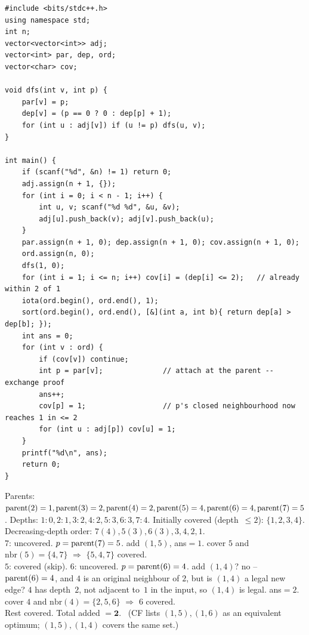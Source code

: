 \begin{lstlisting}[caption={Codeforces 1029E -- deepest-uncovered leaf-pruning greedy (\coderef{c27-greedy}), parent-attachment}, label={lst:c27-1029e-soln}]
#include <bits/stdc++.h>
using namespace std;
int n;
vector<vector<int>> adj;
vector<int> par, dep, ord;
vector<char> cov;

void dfs(int v, int p) {
    par[v] = p;
    dep[v] = (p == 0 ? 0 : dep[p] + 1);
    for (int u : adj[v]) if (u != p) dfs(u, v);
}

int main() {
    if (scanf("%d", &n) != 1) return 0;
    adj.assign(n + 1, {});
    for (int i = 0; i < n - 1; i++) {
        int u, v; scanf("%d %d", &u, &v);
        adj[u].push_back(v); adj[v].push_back(u);
    }
    par.assign(n + 1, 0); dep.assign(n + 1, 0); cov.assign(n + 1, 0);
    ord.assign(n, 0);
    dfs(1, 0);
    for (int i = 1; i <= n; i++) cov[i] = (dep[i] <= 2);   // already within 2 of 1
    iota(ord.begin(), ord.end(), 1);
    sort(ord.begin(), ord.end(), [&](int a, int b){ return dep[a] > dep[b]; });
    int ans = 0;
    for (int v : ord) {
        if (cov[v]) continue;
        int p = par[v];              // attach at the parent -- exchange proof
        ans++;
        cov[p] = 1;                  // p's closed neighbourhood now reaches 1 in <= 2
        for (int u : adj[p]) cov[u] = 1;
    }
    printf("%d\n", ans);
    return 0;
}
\end{lstlisting}

\begin{tracebox}[Official Example~1: $n=7$, edges $1\text{--}2,2\text{--}3,2\text{--}4,4\text{--}5,4\text{--}6,5\text{--}7$ $\Rightarrow$ 2]
Parents: $\operatorname{parent}(2)=1,\operatorname{parent}(3)=2,\operatorname{parent}(4)=2,\operatorname{parent}(5)=4,\operatorname{parent}(6)=4,\operatorname{parent}(7)=5$.
Depths: $1\!:\!0,2\!:\!1,3\!:\!2,4\!:\!2,5\!:\!3,6\!:\!3,7\!:\!4$. Initially covered
(depth~$\le2$): $\{1,2,3,4\}$. Decreasing-depth order: $7(4),5(3),6(3),3,4,2,1$.\\
$7$: uncovered. $p=\operatorname{parent}(7)=5$. add $(1,5)$, ans$=1$. cover $5$ and
$\mathrm{nbr}(5)=\{4,7\}$ $\Rightarrow$ $\{5,4,7\}$ covered.\\
$5$: covered (skip). \;\;$6$: uncovered. $p=\operatorname{parent}(6)=4$. add $(1,4)$? no --
$\operatorname{parent}(6)=4$, and $4$ is an original neighbour of $2$, but is $(1,4)$ a legal new
edge? $4$ has depth~$2$, not adjacent to~$1$ in the input, so $(1,4)$ is legal. ans$=2$.
cover $4$ and $\mathrm{nbr}(4)=\{2,5,6\}$ $\Rightarrow$ $6$ covered.\\
Rest covered. Total added $=\mathbf{2}$. \checkmark\ (CF lists $(1,5),(1,6)$ as an
equivalent optimum; $(1,5),(1,4)$ covers the same set.)
\end{tracebox}


